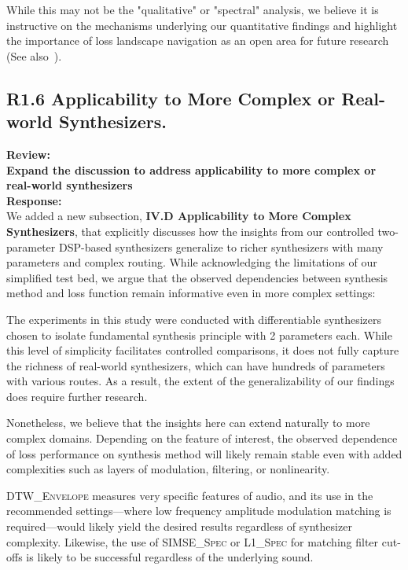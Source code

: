 \documentclass[11pt]{article}
\newcommand{\DTWEnv}{\textsc{DTW\_Envelope}}
\newcommand{\SIMSESpec}{\textsc{SIMSE\_Spec}}
\newcommand{\LoneSpec}{\textsc{L1\_Spec}}
\begin{document}
While this may not be the "qualitative" or "spectral" analysis, we believe it is instructive on the mechanisms underlying our quantitative findings and highlight the importance of loss landscape navigation as an open area for future research (See also~).



\subsection*{R1.6 Applicability to More Complex or Real-world Synthesizers.}
\label{R1.6}
\noindent\textbf{Review:} \\
\noindent \textbf{Expand the discussion to address applicability to more complex or real-world synthesizers}
\\

\noindent\textbf{Response:} \\
We added a new subsection, \textbf{IV.D Applicability to More Complex Synthesizers}, that explicitly discusses how the insights from our controlled two-parameter DSP-based synthesizers generalize to richer synthesizers with many parameters and complex routing. While acknowledging the limitations of our simplified test bed, we argue that the observed dependencies between synthesis method and loss function remain informative even in more complex settings:

\begin{displayquote}
    The experiments in this study were conducted with differentiable synthesizers chosen to isolate fundamental synthesis principle with 2 parameters each. While this level of simplicity facilitates controlled comparisons, it does not fully capture the richness of real-world synthesizers, which can have hundreds of parameters with various routes. As a result, the extent of the generalizability of our findings does require further research. 

    Nonetheless, we believe that the insights here can extend naturally to more complex domains. Depending on the feature of interest, the observed dependence of loss performance on synthesis method will likely remain stable even with added complexities such as layers of modulation, filtering, or nonlinearity. 
    
    \DTWEnv{} measures very specific features of audio, and its use in the recommended settings---where low frequency amplitude modulation matching is required---would likely yield the desired results regardless of synthesizer complexity. Likewise, the use of \SIMSESpec{} or \LoneSpec{} for matching filter cut-offs is likely to be successful regardless of the underlying sound. 
    \end{displayquote}
    
\end{document}
